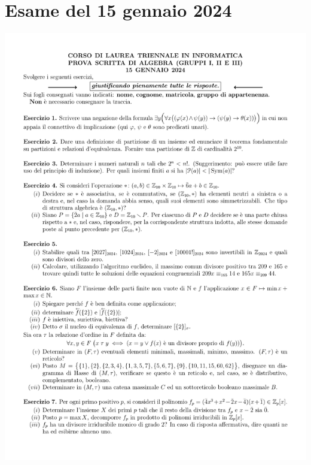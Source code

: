 \vfill
\section{Esame del 15 gennaio 2024}
\begin{center}
	\includegraphics[scale=.85]{pdf/Traccia_150124}
\end{center}
